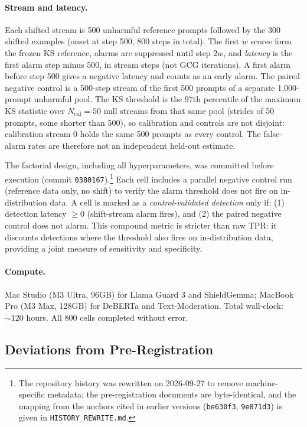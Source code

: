 \documentclass{article}
\begin{document}
\paragraph{Stream and latency.} Each shifted stream is 500 unharmful reference prompts followed by the 300 shifted examples (onset at step 500, 800 steps in total). The first $w$ scores form the frozen KS reference, alarms are suppressed until step $2w$, and \emph{latency} is the first alarm step minus 500, in stream steps (not GCG iterations). A first alarm before step 500 gives a negative latency and counts as an early alarm. The paired negative control is a 500-step stream of the first 500 prompts of a separate 1{,}000-prompt unharmful pool. The KS threshold is the 97th percentile of the maximum KS statistic over $N_{\text{cal}}{=}50$ null streams from that same pool (strides of 50 prompts, some shorter than 500), so calibration and controls are not disjoint: calibration stream 0 holds the same 500 prompts as every control. The false-alarm rates are therefore not an independent held-out estimate.

The factorial design, including all hyperparameters, was committed before execution (commit \texttt{0380167}).\footnote{The repository history was rewritten on 2026-09-27 to remove machine-specific metadata; the pre-registration documents are byte-identical, and the mapping from the anchors cited in earlier versions (\texttt{be630f3}, \texttt{9e871d3}) is given in \texttt{HISTORY\_REWRITE.md}.} Each cell includes a parallel negative control run (reference data only, no shift) to verify the alarm threshold does not fire on in-distribution data. A cell is marked as a \emph{control-validated detection} only if: (1) detection latency $\geq 0$ (shift-stream alarm fires), and (2) the paired negative control does not alarm. This compound metric is stricter than raw TPR: it discounts detections where the threshold also fires on in-distribution data, providing a joint measure of sensitivity and specificity.

\paragraph{Compute.} Mac Studio (M3 Ultra, 96GB) for Llama Guard 3 and ShieldGemma; MacBook Pro (M3 Max, 128GB) for DeBERTa and Text-Moderation. Total wall-clock: ${\sim}120$ hours. All 800 cells completed without error.

\subsection{Deviations from Pre-Registration}
\label{sec:deviations}
\end{document}
